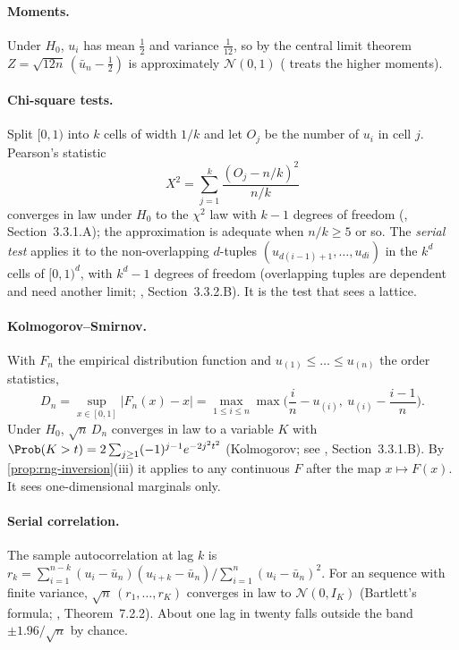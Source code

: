 \paragraph{Moments.} Under $H_0$, $u_i$ has mean $\frac12$ and variance $\frac1{12}$, so by the
central limit theorem $Z=\sqrt{12n}\,(\bar u_n-\frac12)$ is approximately $\mathcal N(0,1)$
( treats the higher moments).

\paragraph{Chi-square tests.} Split $[0,1)$ into $k$ cells of width $1/k$ and let $O_j$ be the
number of $u_i$ in cell $j$. Pearson's statistic
\[
  X^2=\sum_{j=1}^{k}\frac{(O_j-n/k)^2}{n/k}
\]
converges in law under $H_0$ to the $\chi^2$ law with $k-1$ degrees of freedom
(\textcite{knuth-taocp2}, Section~3.3.1.A); the approximation is adequate when $n/k\ge5$ or
so. The \emph{serial test} applies it to the non-overlapping $d$-tuples
$(u_{d(i-1)+1},\dots,u_{di})$ in the $k^d$ cells of $[0,1)^d$, with $k^d-1$ degrees of freedom
(overlapping tuples are dependent and need another limit; \textcite{knuth-taocp2},
Section~3.3.2.B). It is the test that sees a lattice.

\paragraph{Kolmogorov--Smirnov.} With $F_n$ the empirical distribution function and
$u_{(1)}\le\dots\le u_{(n)}$ the order statistics,
\[
  D_n=\sup_{x\in[0,1]}|F_n(x)-x|=\max_{1\le i\le n}\max\Big(\frac in-u_{(i)},\ u_{(i)}-\frac{i-1}n\Big).
\]
Under $H_0$, $\sqrt n\,D_n$ converges in law to a variable $K$ with
$\Prob(K>t)=2\sum_{j\ge1}(-1)^{j-1}e^{-2j^2t^2}$ (Kolmogorov; see \textcite{knuth-taocp2},
Section~3.3.1.B). By \cref{prop:rng-inversion}(iii) it applies to any continuous $F$ after the
map $x\mapsto F(x)$. It sees one-dimensional marginals only.

\paragraph{Serial correlation.} The sample autocorrelation at lag $k$ is
$r_k=\sum_{i=1}^{n-k}(u_i-\bar u_n)(u_{i+k}-\bar u_n)\big/\sum_{i=1}^{n}(u_i-\bar u_n)^2$.
For an \iid sequence with finite variance, $\sqrt n\,(r_1,\dots,r_K)$ converges in law to
$\mathcal N(0,I_K)$ (Bartlett's formula; \textcite{brockwell-davis}, Theorem~7.2.2).
About one lag in twenty falls outside the band $\pm1.96/\sqrt n$ by chance.

